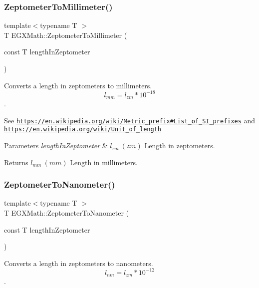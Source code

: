 \subsubsection{\texorpdfstring{Zeptometer\+To\+Millimeter()}{ZeptometerToMillimeter()}}
{\footnotesize\ttfamily template$<$typename T $>$ \\
T E\+G\+X\+Math\+::\+Zeptometer\+To\+Millimeter (\begin{DoxyParamCaption}\item[{const T}]{length\+In\+Zeptometer }\end{DoxyParamCaption})}



Converts a length in zeptometers to millimeters. \[ l_{mm}=l_{zm} * 10^{-18} \]. 

See \href{https://en.wikipedia.org/wiki/Metric_prefix#List_of_SI_prefixes}{\tt https\+://en.\+wikipedia.\+org/wiki/\+Metric\+\_\+prefix\#\+List\+\_\+of\+\_\+\+S\+I\+\_\+prefixes} and \href{https://en.wikipedia.org/wiki/Unit_of_length}{\tt https\+://en.\+wikipedia.\+org/wiki/\+Unit\+\_\+of\+\_\+length} 
\begin{DoxyParams}{Parameters}
{\em length\+In\+Zeptometer} & $ l_{zm}\ (zm)$ Length in zeptometers. \\
\hline
\end{DoxyParams}
\begin{DoxyReturn}{Returns}
$ l_{mm}\ (mm)$ Length in millimeters. 
\end{DoxyReturn}
\mbox{\label{group___e_g_x_math-_conversions-_length_conversions-_zeptometer-_s_i_ga0a9d1243a7723cac27aeb6ed48acc3e8}} 
\subsubsection{\texorpdfstring{Zeptometer\+To\+Nanometer()}{ZeptometerToNanometer()}}
{\footnotesize\ttfamily template$<$typename T $>$ \\
T E\+G\+X\+Math\+::\+Zeptometer\+To\+Nanometer (\begin{DoxyParamCaption}\item[{const T}]{length\+In\+Zeptometer }\end{DoxyParamCaption})}



Converts a length in zeptometers to nanometers. \[ l_{nm}=l_{zm} * 10^{-12} \]. 

